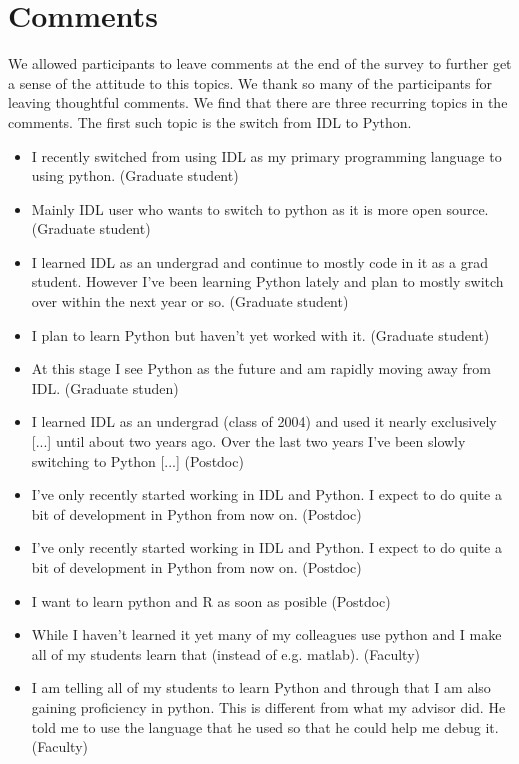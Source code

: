 \section{Comments}

We allowed participants to leave comments at the end of the survey to further get a sense of the attitude to this topics. We thank so many of the participants for leaving thoughtful comments. We find that there are three recurring topics in the comments. The first such topic is the switch from IDL to Python. 

\begin{itemize}
\item{I recently switched from using IDL as my primary programming language to using python. (Graduate student)}
\item{Mainly IDL user who wants to switch to python as it is more open source. (Graduate student)}
\item{I learned IDL as an undergrad and continue to mostly code in it as a grad student. However I've been learning Python lately and plan to mostly switch over within the next year or so. (Graduate student)}
\item{I plan to learn Python but haven't yet worked with it. (Graduate student)}
\item{At this stage I see Python as the future and am rapidly moving away from IDL. (Graduate studen)}
\item{I learned IDL as an undergrad (class of 2004) and used it nearly exclusively [...] until about two years ago. Over the last two years I've been slowly switching to Python [...]
(Postdoc)}
\item{I've only recently started working in IDL and Python.  I expect to do quite a bit of development in Python from now on. (Postdoc)}
\item{I've only recently started working in IDL and Python.  I expect to do quite a bit of development in Python from now on. (Postdoc)}
\item{I want to learn python and R as soon as posible (Postdoc)}
\item{While I haven't learned it yet many of my colleagues use python and I make all of my students learn that (instead of e.g. matlab). (Faculty)}
\item{I am telling all of my students to learn Python and through that I am also gaining proficiency in python.  This is different from what my advisor did.  He told me to use the language that he used so that he could help me debug it. (Faculty)}

\end{itemize}

